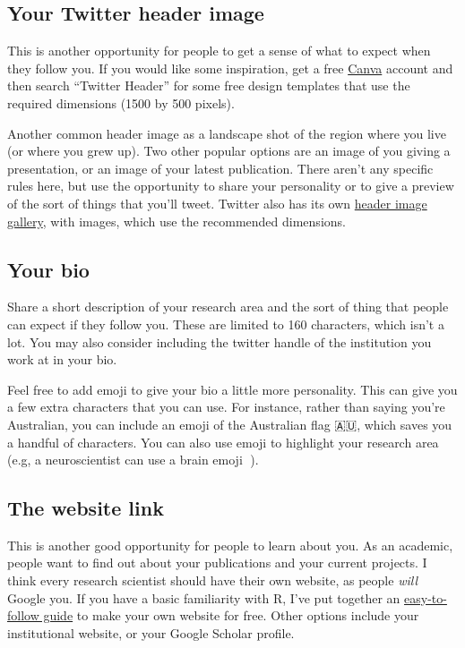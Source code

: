 \documentclass[]{book}
\begin{document}
\hypertarget{your-twitter-header-image}{%
\subsection{Your Twitter header image}\label{your-twitter-header-image}}

This is another opportunity for people to get a sense of what to expect when they follow you. If you would like some inspiration, get a free \href{https://canva.com/}{Canva} account and then search ``Twitter Header'' for some free design templates that use the required dimensions (1500 by 500 pixels).

Another common header image as a landscape shot of the region where you live (or where you grew up). Two other popular options are an image of you giving a presentation, or an image of your latest publication. There aren't any specific rules here, but use the opportunity to share your personality or to give a preview of the sort of things that you'll tweet. Twitter also has its own \href{https://www.flickr.com/photos/twitteroffice/sets/72157643560484885/}{header image gallery}, with images, which use the recommended dimensions.

\hypertarget{your-bio}{%
\subsection{Your bio}\label{your-bio}}

Share a short description of your research area and the sort of thing that people can expect if they follow you. These are limited to 160 characters, which isn't a lot. You may also consider including the twitter handle of the institution you work at in your bio.

Feel free to add emoji to give your bio a little more personality. This can give you a few extra characters that you can use. For instance, rather than saying you're Australian, you can include an emoji of the Australian flag 🇦🇺, which saves you a handful of characters. You can also use emoji to highlight your research area (e.g, a neuroscientist can use a brain emoji 🧠).

\hypertarget{the-website-link}{%
\subsection{The website link}\label{the-website-link}}

This is another good opportunity for people to learn about you. As an academic, people want to find out about your publications and your current projects. I think every research scientist should have their own website, as people \emph{will} Google you. If you have a basic familiarity with R, I've put together an \href{https://www.dsquintana.blog/free-website-in-r-easy/}{easy-to-follow guide} to make your own website for free. Other options include your institutional website, or your Google Scholar profile.
\end{document}

